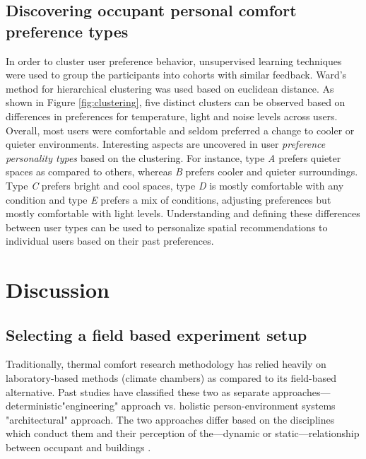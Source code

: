 \documentclass[]{interact}
\theoremstyle{plain}%
\theoremstyle{definition}
\theoremstyle{remark}
\begin{document}

\subsection{Discovering occupant personal comfort preference types}
 In order to cluster user preference behavior, unsupervised learning techniques were used to group the participants into cohorts with similar feedback. Ward's method for hierarchical clustering was used based on euclidean distance. As shown in Figure \ref{fig:clustering}, five distinct clusters can be observed based on differences in preferences for temperature, light and noise levels across users.  Overall, most users were comfortable and seldom preferred a change to cooler or quieter environments. Interesting aspects are uncovered in user \emph{preference personality types} based on the clustering. For instance, type \emph{A} prefers quieter spaces as compared to others, whereas \emph{B} prefers cooler and quieter surroundings. Type \emph{C} prefers bright and cool spaces, type \emph{D} is mostly comfortable with any condition and type \emph{E} prefers a mix of conditions, adjusting preferences but mostly comfortable with light levels. Understanding and defining these differences between user types can be used to personalize spatial recommendations to individual users based on their past preferences. 

\section{Discussion}

\subsection{Selecting a field based experiment setup}
Traditionally, thermal comfort research methodology has relied heavily on laboratory-based methods (climate chambers) as compared to its field-based alternative. Past studies have classified these two as separate approaches---deterministic"engineering" approach vs. holistic person-environment systems "architectural" approach. The two approaches differ based on the disciplines which conduct them and their perception of the---dynamic or static---relationship between occupant and buildings \cite{dedear}.
\end{document}
